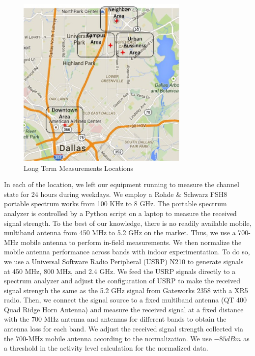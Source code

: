 \begin{figure}
\vspace{-0.0in}
\centering
\includegraphics[width=84mm]{figures/measurements_map}
\vspace{-0.1in}
\caption{Long Term Measurements Locations}
\label{fig:measurement_map}
\vspace{-0.1in}
\end{figure}

In each of the location, we left our equipment running to measure the channel state for 24 hours during 
weekdays. 
We employ a Rohde \& Schwarz FSH8 portable spectrum works from 100 KHz to 8 GHz. 
The portable spectrum analyzer is controlled by a Python script on a laptop to measure 
the received signal strength.
To the best of our knowledge, there is no readily available mobile, multiband antenna from
450 MHz to 5.2 GHz on the market. Thus, we use a 700-MHz mobile antenna to perform in-field
measurements. We then normalize the mobile antenna performance across bands with indoor 
experimentation. To do so, we use a Universal Software Radio Peripheral (USRP) N210 to 
generate signals at 450 MHz, 800 MHz, and 2.4 GHz. We feed the USRP signals directly
to a spectrum analyzer and adjust the configuration of USRP to make the received signal 
strength the same as the 5.2 GHz signal from Gateworks 2358 with a XR5 radio. Then, we connect 
the signal source to a fixed multiband antenna (QT 400 Quad Ridge Horn Antenna) and measure the
received signal at a fixed distance with the 700 MHz antenna and antennas for different bands
to obtain the antenna loss for each band. We adjust the received signal strength
collected via the 700-MHz mobile antenna according to the normalization.
We use $-85 dBm$ as a threshold in the activity level calculation for the normalized data.

